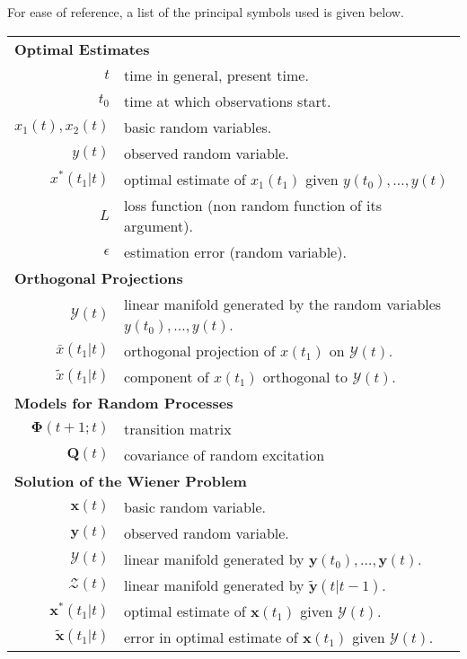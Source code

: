\documentclass{article}
\newcommand{\manf}[1]{\mathbf{\mathcal{#1}}}
\begin{document}
For ease of reference, a list of the principal symbols used is given below.
\begin{table}[htbp]
\centering
\begin{tabular}{rl}
\multicolumn{2}{l}{\textbf{Optimal Estimates}}\\
$t$ & time in general, present time.\\
$t_0$ & time at which observations start.\\
$x_1(t),x_2(t)$ & basic random variables.\\
$y(t)$ & observed random variable.\\
$x^\ast (t_1 \vert t)$ & optimal estimate of $x_1(t_1)$ given $y(t_0), \dotsc, y(t)$\\
$L$ & loss function (non random function of its argument).\\
$\epsilon$ & estimation error (random variable).\\
\multicolumn{2}{l}{\textbf{Orthogonal Projections}}\\
$\mathbf{\mathcal{Y}}(t)$ & linear manifold generated by the random variables $y(t_0), \dotsc, y(t)$.\\
$\bar{x}(t_1 \vert t)$ & orthogonal projection of $x(t_1)$ on $\mathbf{\mathcal{Y}}(t)$.\\
$\tilde{x}(t_1 \vert t)$ & component of $x(t_1)$ orthogonal to $\mathbf{\mathcal{Y}}(t)$.\\
\multicolumn{2}{l}{\textbf{Models for Random Processes}}\\
$\boldsymbol{\Phi}(t+1 ; t)$ & transition matrix\\
$\mathbf{Q}(t)$ & covariance of random excitation\\
\multicolumn{2}{l}{\textbf{Solution of the Wiener Problem}}\\
$\mathbf{x}(t)$ & basic random variable.\\
$\mathbf{y}(t)$ & observed random variable.\\
$\manf{Y}(t)$ & linear manifold generated by $\mathbf{y}(t_0), \dotsc, \mathbf{y}(t)$.\\
$\manf{Z}(t)$ & linear manifold generated by $\tilde{\mathbf{y}}(t \vert t-1)$.\\
$\mathbf{x}^\ast(t_1 \vert t)$ & optimal estimate of $\mathbf{x}(t_1)$ given $\manf{Y}(t)$.\\
$\tilde{\mathbf{x}}(t_1 \vert t)$ & error in optimal estimate of $\mathbf{x}(t_1)$ given $\manf{Y}(t)$.
\end{tabular}
\end{table}
\end{document}
